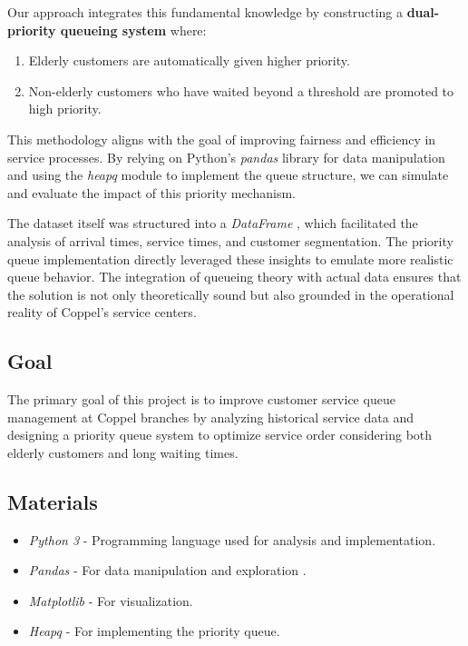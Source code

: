 \documentclass[twoside]{article}
\begin{document}
Our approach integrates this fundamental knowledge by constructing a \textbf{dual-priority queueing system} where:
\begin{enumerate}
    \item Elderly customers are automatically given higher priority.
    \item Non-elderly customers who have waited beyond a threshold are promoted to high priority.
\end{enumerate}

This methodology aligns with the goal of improving fairness and efficiency in service processes. By relying on Python's \textit{pandas} library for data manipulation \cite{pandas} and using the \textit{heapq} module to implement the queue structure, we can simulate and evaluate the impact of this priority mechanism.

The dataset itself was structured into a \textit{DataFrame} \cite{dataframe}, which facilitated the analysis of arrival times, service times, and customer segmentation. The priority queue implementation directly leveraged these insights to emulate more realistic queue behavior. The integration of queueing theory with actual data ensures that the solution is not only theoretically sound but also grounded in the operational reality of Coppel's service centers.


\subsection*{Goal}
The primary goal of this project is to improve customer service queue management at Coppel branches by analyzing historical service data and designing a priority queue system to optimize service order considering both elderly customers and long waiting times.

\subsection*{Materials}
\begin{itemize}
  \item \textit{Python 3} - Programming language used for analysis and implementation.
  \item \textit{Pandas} - For data manipulation and exploration \cite{pandas}.
  \item \textit{Matplotlib} - For visualization.
  \item \textit{Heapq} - For implementing the priority queue.
\end{itemize}
\end{document}
